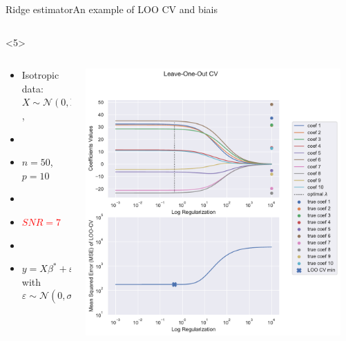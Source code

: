 \documentclass[10pt,aspectratio=43]{beamer}
\begin{document}
\begin{frame}{Ridge estimator}{An example of LOO CV and biais}
\begin{onlyenv}
\begin{columns}
\begin{column}{0.7\textwidth}
\begin{center}
                 \end{center}
            \end{column}
            \end{columns}
    \end{onlyenv}
    \begin{onlyenv}<5>
        \begin{columns}
            \begin{column}{0.4\textwidth}
                \begin{itemize}
                    \item Isotropic data: $X\sim\mathcal{N}(0,\mathrm{Id})$,
                    \item[]
                    \item $n=50$, $p=10$
                    \item[]
                    \item \textcolor{red}{$SNR=7$}
                    \item[]
                    \item $y = X\beta^*+\varepsilon$ with $\varepsilon\sim \mathcal{N}(0, \sigma^2\mathrm{Id})$
                \end{itemize}
            \end{column}
            \begin{column}{0.7\textwidth}
                \begin{center}
                        \includegraphics[width=0.95\textwidth]{path_ridge_complete_7_.pdf}

\end{center}
\end{column}
\end{columns}
\end{onlyenv}
\end{frame}
\end{document}
